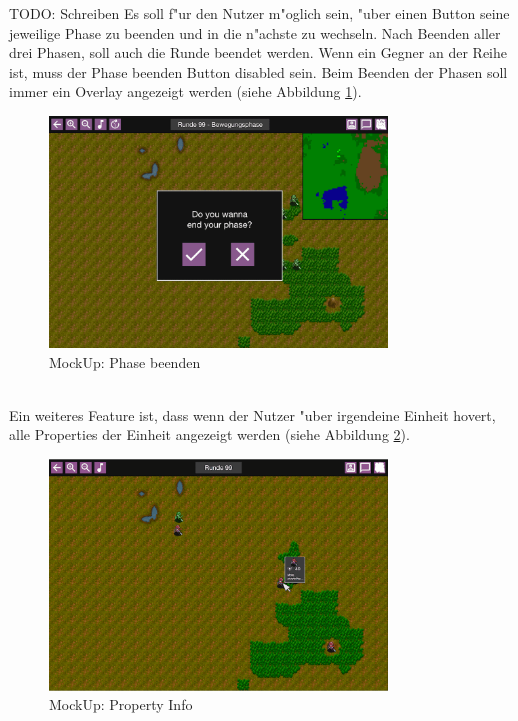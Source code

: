 \documentclass[12pt, titlepage]{scrartcl}
\newcounter{subsubsubsection}[subsubsection]
\begin{document}
			     \label{MockUps_Sidebar_Section}
			        TODO: Schreiben
			        Es soll f"ur den Nutzer m"oglich sein, "uber einen Button seine jeweilige Phase zu beenden und in die n"achste zu wechseln. Nach Beenden aller drei Phasen, soll auch die Runde beendet werden. Wenn ein Gegner an der Reihe ist, muss der Phase beenden Button disabled sein. Beim Beenden der Phasen soll immer ein Overlay angezeigt werden (siehe Abbildung \ref{Phase_End}). \\
			        \begin{figure}[H] 
    				    \centering
    				    \includegraphics[width=0.8\textwidth]{images/mockUps/EndPhase.png}
    				    \caption{MockUp: Phase beenden}
    				    \label{Phase_End}
			        \end{figure}
			        \ \\ Ein weiteres Feature ist, dass wenn der Nutzer "uber irgendeine Einheit hovert, alle Properties der Einheit angezeigt werden (siehe Abbildung \ref{Property_Info}). \\
			        \begin{figure}[H] 
    				    \centering
    				    \includegraphics[width=0.8\textwidth]{images/mockUps/showPropertiesWhenHovered.png}
    				    \caption{MockUp: Property Info}
    				    \label{Property_Info}
			        \end{figure}
\end{document}
